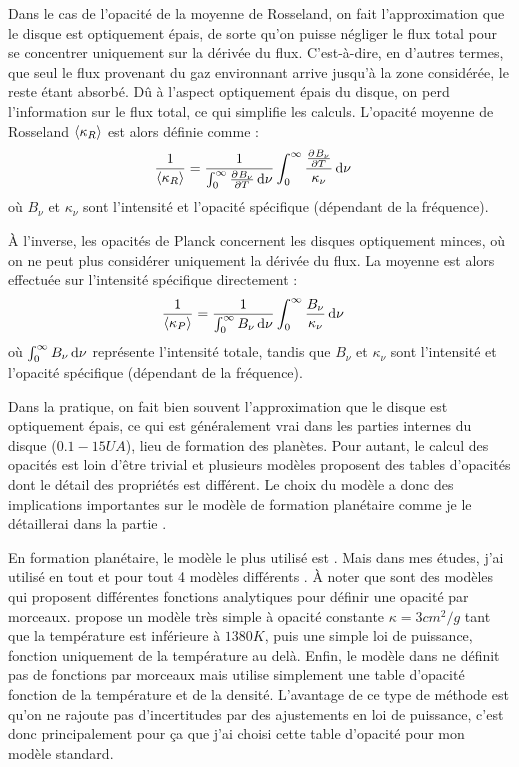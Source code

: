 Dans le cas de l'opacité de la moyenne de Rosseland, on fait l'approximation que le disque est optiquement épais, de sorte qu'on puisse négliger le flux total pour se concentrer uniquement sur la dérivée du flux. C'est-à-dire, en d'autres termes, que seul le flux provenant du gaz environnant arrive jusqu'à la zone considérée, le reste étant absorbé. Dû à l'aspect optiquement épais du disque, on perd l'information sur le flux total, ce qui simplifie les calculs. L'opacité moyenne de Rosseland $\left\langle \kappa_R\right\rangle$ est alors définie comme : 
\begin{align}
\inv{\moy{\kappa_R}} &= \inv{\int_0^\infty \pd{B_\nu}{T}\dif \nu} \int_0^\infty \frac{\pd{B_\nu}{T}}{\kappa_\nu}\dif \nu
\end{align}
où $B_\nu$ et $\kappa_\nu$ sont l'intensité et l'opacité spécifique (dépendant de la fréquence).

À l'inverse, les opacités de Planck concernent les disques optiquement minces, où on ne peut plus considérer uniquement la dérivée du flux. La moyenne est alors effectuée sur l'intensité spécifique directement : 
\begin{align}
\frac{1}{\left\langle \kappa_P\right\rangle} &= \frac{1}{\int_0^\infty B_\nu\operatorname{d \!} \nu} \int_0^\infty \frac{B_\nu}{\kappa_\nu}\operatorname{d \!} \nu
\end{align}
où $\int_0^\infty B_\nu\operatorname{d \!} \nu$ représente l'intensité totale, tandis que $B_\nu$ et $\kappa_\nu$ sont l'intensité et l'opacité spécifique (dépendant de la fréquence).

Dans la pratique, on fait bien souvent l'approximation que le disque est optiquement épais, ce qui est généralement vrai dans les parties internes du disque ($0.1-15\unit{UA}$), lieu de formation des planètes. Pour autant, le calcul des opacités est loin d'être trivial et plusieurs modèles proposent des tables d'opacités dont le détail des propriétés est différent. Le choix du modèle a donc des implications importantes sur le modèle de formation planétaire comme je le détaillerai dans la partie . 

En formation planétaire, le modèle le plus utilisé est \citep{bell1994FU}. Mais dans mes études, j'ai utilisé en tout et pour
tout 4 modèles différents \citep{bell1994FU, zhu2009nonsteady, chambers2009analytic, hure2000transition}. À noter que
\citep{bell1994FU, zhu2009nonsteady} sont des modèles qui proposent différentes fonctions analytiques pour définir une opacité
par morceaux. \citep{chambers2009analytic} propose un modèle très simple à opacité constante $\kappa=3\unit{cm^2/g}$ tant que la température
est inférieure à $1380\unit{K}$, puis une simple loi de puissance, fonction uniquement de la température au delà. Enfin, le
modèle dans \citep{hure2000transition} ne définit pas de fonctions par morceaux mais utilise simplement une table d'opacité
fonction de la température et de la densité. L'avantage de ce type de méthode est qu'on ne rajoute pas d'incertitudes par des
ajustements en loi de puissance, c'est donc principalement pour ça que j'ai choisi cette table d'opacité pour mon modèle
standard. 

